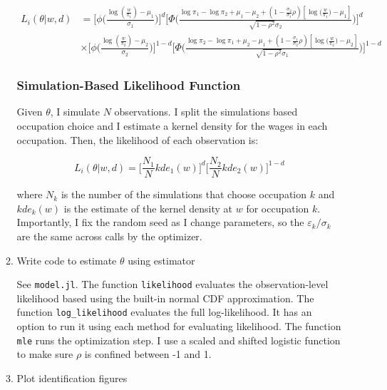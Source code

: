 \documentclass{article}
\begin{document}
\begin{enumerate}
\begin{enumerate}
\begin{align*}
L_i(\theta| w, d) 
&= 
\Bigg[\phi\Bigg(\frac{\log(\frac{w}{\pi_1}) - \mu_1}{\sigma_1}\Bigg)\Bigg]^{d}\Bigg[\Phi\Bigg( \frac{\log \pi_1 - \log \pi_2 + \mu_1 -\mu_2 + (1 - \frac{\sigma_2}{\sigma_1}\rho)[\log\Big(\frac{w}{\pi_1}\Big) - \mu_1]}{\sqrt{1- \rho^2} \sigma_2} \Bigg)\Bigg]^{d}\\
&\times
\Bigg[\phi\Bigg(\frac{\log(\frac{w}{\pi_2}) - \mu_2}{\sigma_2}\Bigg)\Bigg]^{1-d}
\Bigg[\Phi\Bigg( \frac{\log \pi_2 - \log \pi_1 + \mu_2 -\mu_1 + (1 - \frac{\sigma_1}{\sigma_2}\rho)[\log\Big(\frac{w}{\pi_2}\Big) - \mu_2]}{\sqrt{1- \rho^2} \sigma_1} \Bigg)\Bigg]^{1-d}
\end{align*}

\subsubsection*{Simulation-Based Likelihood Function}

Given $\theta$, I simulate $N$ observations.  I split the simulations based occupation choice and I estimate a kernel density for the wages in each occupation.  Then, the likelihood of each observation is:

$$
L_i(\theta|w, d) = \Bigg[\frac{N_1}{N} kde_1(w)\Bigg]^{d} \Bigg[\frac{N_2}{N} kde_2(w)\Bigg]^{1-d}
$$

where $N_k$ is the number of the simulations that choose occupation $k$ and $kde_k(w)$ is the estimate of the kernel density at $w$ for occupation $k$. Importantly, I fix the random seed as I change parameters, so the $\varepsilon_k/\sigma_k$ are the same across calls by the optimizer.

\bigskip

\item Write code to estimate $\theta$ using estimator

\bigskip

See \texttt{model.jl}.  The function \texttt{likelihood} evaluates the observation-level likelihood based using the built-in normal CDF approximation. The function \texttt{log\_likelihood} evaluates the full log-likelihood.  It has an option to run it using each method for evaluating likelihood.  The function \texttt{mle} runs the optimization step.  I use a scaled and shifted logistic function to make sure $\rho$ is confined between -1 and 1.

\pagebreak

\item Plot identification figures


\end{enumerate}
\end{enumerate}
\end{document}
